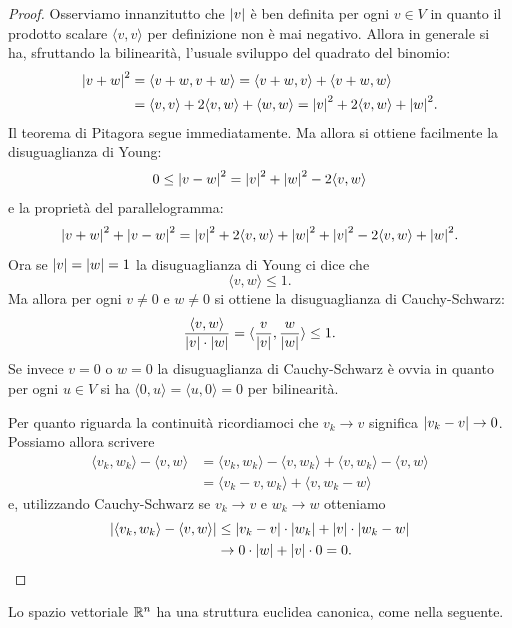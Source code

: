 \begin{proof}
Osserviamo innanzitutto che ${\left|v\right|}$ è ben definita per ogni $v\in V$
in quanto il prodotto scalare $\langle v,v\rangle$ per definizione non è mai negativo.
Allora in generale si ha, sfruttando la bilinearità,
l'usuale sviluppo del quadrato del binomio:
\begin{align*}
  {\left|v+w\right|}^2
  &= \langle v+w, v+w\rangle
  = \langle v+w, v\rangle + \langle v+w, w\rangle \\
  &= \langle v,v\rangle + 2\langle v,w \rangle + \langle w,w\rangle
  = {\left|v\right|}^2 + 2\langle v,w \rangle + {\left|w\right|}^2.
\end{align*}
Il teorema di Pitagora segue immediatamente.
Ma allora si ottiene facilmente la disuguaglianza di Young:
\[
  0 \le {\left|v-w\right|}^2 = {\left|v\right|}^2 + {\left|w\right|}^2 - 2 \langle v,w\rangle
\]
e la proprietà del parallelogramma:
\[
  {\left|v+w\right|}^2 + {\left|v-w\right|}^2
  = {\left|v\right|}^2 + 2\langle v,w \rangle + {\left|w\right|}^2
    + {\left|v\right|}^2 - 2\langle v,w\rangle + {\left|w\right|}^2.
\]
Ora se ${\left|v\right|}={\left|w\right|}=1$ la disuguaglianza di Young ci dice che
\[
  \langle v,w \rangle \le 1.
\]
Ma allora per ogni $v\neq 0$ e $w \neq 0$ si ottiene
la disuguaglianza di Cauchy-Schwarz:
\[
\frac{\langle v,w\rangle}{{\left|v\right|}\cdot {\left|w\right|}}
 = \langle \frac{v}{{\left|v\right|}} , \frac{w}{{\left|w\right|}}\rangle
 \le 1.
\]
Se invece $v=0$ o $w=0$ la disuguaglianza di Cauchy-Schwarz è ovvia in quanto
per ogni $u\in V$ si ha
$\langle 0, u\rangle = \langle u,0\rangle = 0$ per bilinearità.

Per quanto riguarda la continuità
ricordiamoci che $v_k \to v$ significa ${\left|v_k-v\right|}\to 0$.
Possiamo allora scrivere
\begin{align*}
  \langle v_k,w_k\rangle - \langle v,w\rangle
&= \langle v_k,w_k\rangle - \langle v, w_k\rangle +  \langle v,w_k\rangle - \langle v,w\rangle \\
&= \langle v_k - v, w_k\rangle + \langle v, w_k -w\rangle
\end{align*}
e, utilizzando Cauchy-Schwarz se $v_k\to v$ e $w_k\to w$ otteniamo
\begin{align*}
{\left|\langle v_k,w_k\rangle - \langle v,w\rangle\right|}
&\le {\left|v_k-v\right|}\cdot {\left|w_k\right|} + {\left|v\right|}\cdot {\left|w_k-w\right|}\\
&\to 0\cdot {\left|w\right|} + {\left|v\right|}\cdot 0 = 0.
\end{align*}
\end{proof}

Lo spazio vettoriale ${\mathbb R}^n$ ha una struttura euclidea canonica,
come nella seguente.

